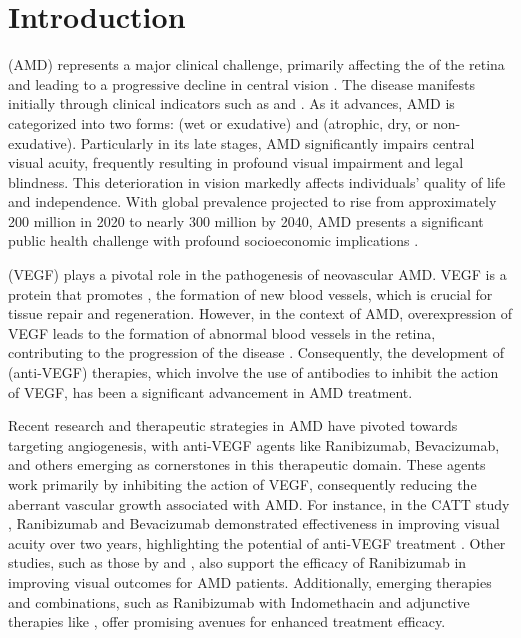\section{Introduction}\label{s:intro}

 (AMD) represents a major clinical challenge, primarily affecting the  of the retina and leading to a progressive decline in central vision \cite{coleman2008,lim2012}. The disease manifests initially through clinical indicators such as  and . As it advances, AMD is categorized into two forms:  (wet or exudative) and  (atrophic, dry, or non-exudative). Particularly in its late stages, AMD significantly impairs central visual acuity, frequently resulting in profound visual impairment and legal blindness. This deterioration in vision markedly affects individuals' quality of life and independence. With global prevalence projected to rise from approximately 200 million in 2020 to nearly 300 million by 2040, AMD presents a significant public health challenge with profound socioeconomic implications \cite{wong2014}.


\newterm{\VEGF} (VEGF) plays a pivotal role in the pathogenesis of neovascular AMD. VEGF is a protein that promotes , the formation of new blood vessels, which is crucial for tissue repair and regeneration. However, in the context of AMD, overexpression of VEGF leads to the formation of abnormal blood vessels in the retina, contributing to the progression of the disease  \cite{farnoodian2017,witmer2003}. Consequently, the development of \newterm{\antiVEGF} (anti-VEGF) therapies, which involve the use of antibodies to inhibit the action of VEGF, has been a significant advancement in AMD treatment.

Recent research and therapeutic strategies in AMD have pivoted towards targeting angiogenesis, with anti-VEGF agents like Ranibizumab, Bevacizumab, and others emerging as cornerstones in this therapeutic domain. These agents work primarily by inhibiting the action of VEGF, consequently reducing the aberrant vascular growth associated with AMD. For instance, in the CATT study \cite{catt2012}, Ranibizumab and Bevacizumab demonstrated effectiveness in improving visual acuity over two years, highlighting the potential of anti-VEGF treatment \cite{catt2012}. Other studies, such as those by \citet{eldem2015} and \citet{ho2014}, also support the efficacy of Ranibizumab in improving visual outcomes for AMD patients. Additionally, emerging therapies and combinations, such as Ranibizumab with Indomethacin \cite{russo2018} and adjunctive therapies like  \cite{semeraro2015}, offer promising avenues for enhanced treatment efficacy.


